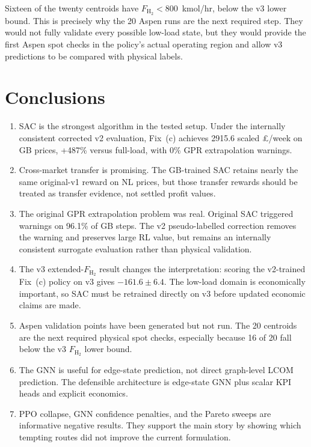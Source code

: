 \documentclass[11pt,a4paper]{article}
\begin{document}
Sixteen of the twenty centroids have $F_{\mathrm{H}_2} < 800$~kmol/hr,
below the v3 lower bound. This is precisely why the 20 Aspen runs are the
next required step. They would not fully validate every possible low-load
state, but they would provide the first Aspen spot checks in the policy's
actual operating region and allow v3 predictions to be compared with physical
labels.

\section{Conclusions}

\begin{enumerate}[nosep]
  \item SAC is the strongest algorithm in the tested setup. Under the
        internally consistent corrected v2 evaluation, Fix~(c) achieves
        2915.6 scaled \pounds/week on GB prices, +487\% versus full-load,
        with 0\% GPR extrapolation warnings.
  \item Cross-market transfer is promising. The GB-trained SAC retains nearly
        the same original-v1 reward on NL prices, but those transfer rewards
        should be treated as transfer evidence, not settled profit
        values.
  \item The original GPR extrapolation problem was real. Original SAC triggered
        warnings on 96.1\% of GB steps. The v2 pseudo-labelled correction
        removes the warning and preserves large RL value, but remains an
        internally consistent surrogate evaluation rather than physical
        validation.
  \item The v3 extended-$F_{\mathrm{H}_2}$ result changes the interpretation:
        scoring the v2-trained Fix~(c) policy on v3 gives
        $-161.6 \pm 6.4$. The low-load domain is economically important, so
        SAC must be retrained directly on v3 before updated economic claims
        are made.
  \item Aspen validation points have been generated but not run. The 20
        centroids are the next required physical spot checks, especially
        because 16 of 20 fall below the v3 $F_{\mathrm{H}_2}$ lower bound.
  \item The GNN is useful for edge-state prediction, not direct graph-level
        LCOM prediction. The defensible architecture is edge-state GNN plus
        scalar KPI heads and explicit economics.
  \item PPO collapse, GNN confidence penalties, and the Pareto sweeps are
        informative negative results. They support the main story by showing
        which tempting routes did not improve the current formulation.
\end{enumerate}
\end{document}
